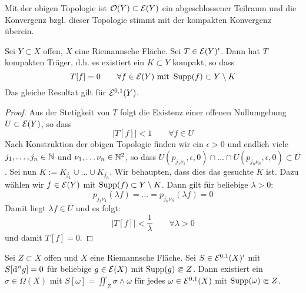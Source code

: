 \begin{cor}
  Mit der obigen Topologie ist $\mathcal{O}(Y) \subset \mathcal{E}(Y)$ ein
  abgeschlossener Teilraum und die Konvergenz bzgl. dieser Topologie
  stimmt mit der kompakten Konvergenz überein.
\end{cor}

\begin{lemma}
  \label{lemma:kompakter-träger-funktional}
  Sei $Y \subset X$ offen, $X$ eine Riemannsche Fläche. Sei $T \in
  \mathcal{E}(Y)'$. 
  Dann hat $T$ kompakten Träger, d.h. es existiert ein $K \subset Y$
  kompakt, so dass
  \[
  T[f] = 0 \qquad \forall f \in \mathcal{E}(Y) \text{ mit } \operatorname{Supp}(f) \subset
  Y \setminus K
  \]
  Das gleiche Resultat gilt für $\mathcal{E}^{0,1}(Y)$.
\end{lemma}

\begin{proof}
  Aus der Stetigkeit von $T$ folgt die Existenz einer offenen
  Nullumgebung $U \subset \mathcal{E}(Y)$, so dass
  \[
  |T[f]| < 1 \qquad \forall f \in U
  \]
  Nach Konstruktion der obigen Topologie finden wir ein $\epsilon > 0$
  und endlich viele $j_1, \dots, j_n \in \mathbb{N}$ und $\nu_1, \dots \nu_n
  \in \mathbb{N}^2$, so dass $U(p_{j_1\nu_1}, \epsilon, 0) \cap \dots \cap
  U(p_{j_n\nu_n}, \epsilon, 0) \subset U$. 
  Sei nun  $K := K_{j_1} \cup \dots \cup K_{j_n}$. Wir behaupten, dass
  dies das gesuchte $K$ ist. 
  Dazu wählen wir $f \in \mathcal{E}(Y)$ mit $\operatorname{Supp}(f) \subset Y \setminus
  K$. Dann gilt für beliebige
  $\lambda > 0$:
  \[
  p_{j_1\nu_1}(\lambda f) = \dots = p_{j_n\nu_n}(\lambda f) = 0
  \]
  Damit liegt $\lambda f \in U$ und es folgt:
  \[
  |T[f]| < \frac1\lambda \qquad \forall \lambda >0
  \]
  und damit $T[f] = 0$.
\end{proof}

\begin{lemma}
  \label{lemma:funktional-explizit}
  Sei $Z \subset X$ offen und $X$ eine Riemannsche Fläche. Sei $S \in
  \mathcal{E}^{0,1}(X)'$ mit $S[\d[''g]] = 0$ für beliebige $g \in \mathcal{E}(X)$
  mit $\operatorname{Supp}(g) \Subset Z$. 
  Dann existiert ein $\sigma \in \Omega(X)$ mit $S[\omega] = \iint_Z
  \sigma \wedge \omega$ für jedes $\omega \in \mathcal{E}^{0,1}(X)$ mit
  $\operatorname{Supp}(\omega) \Subset Z$.
\end{lemma}

